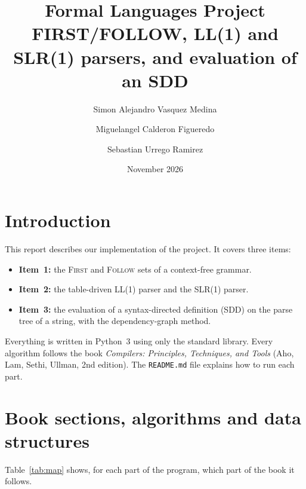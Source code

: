 \documentclass[11pt,a4paper]{article}
\title{Formal Languages Project\\[4pt]
\large FIRST/FOLLOW, LL(1) and SLR(1) parsers, and evaluation of an SDD}
\author{Simon Alejandro Vasquez Medina \and Miguelangel Calderon Figueredo \and Sebastian Urrego Ramirez}
\date{November 2026}
\newcommand{\First}{\textsc{First}}
\newcommand{\Follow}{\textsc{Follow}}
\newcommand{\code}[1]{\texttt{#1}}
\begin{document}
\maketitle

\section{Introduction}

This report describes our implementation of the project. It covers three items:
\begin{itemize}
  \item \textbf{Item~1:} the \First{} and \Follow{} sets of a context-free grammar.
  \item \textbf{Item~2:} the table-driven LL(1) parser and the SLR(1) parser.
  \item \textbf{Item~3:} the evaluation of a syntax-directed definition (SDD) on the parse tree of a string, with the dependency-graph method.
\end{itemize}
Everything is written in Python~3 using only the standard library. Every algorithm follows the book
\emph{Compilers: Principles, Techniques, and Tools} (Aho, Lam, Sethi, Ullman, 2nd edition). The
\code{README.md} file explains how to run each part.

\section{Book sections, algorithms and data structures}

Table~\ref{tab:map} shows, for each part of the program, which part of the book it follows.
\end{document}
